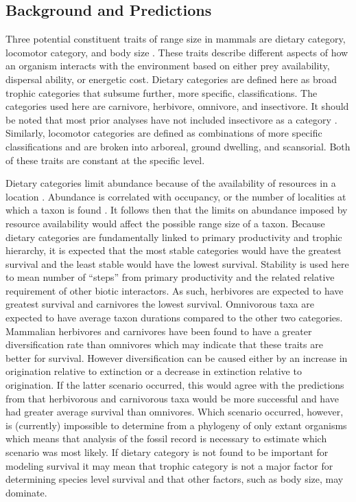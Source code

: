 \documentclass[12pt,letterpaper]{article}
\begin{document}
\subsection{Background and Predictions} 
Three potential constituent traits of range size in mammals are dietary category, locomotor category, and body size \citep{Smith2004,Smith2008b,Damuth1981a,Damuth1979,Jernvall2004,Lyons2005,Lyons2010}. These traits describe different aspects of how an organism interacts with the environment based on either prey availability, dispersal ability, or energetic cost. Dietary categories are defined here as broad trophic categories that subsume further, more specific, classifications. The categories used here are carnivore, herbivore, omnivore, and insectivore. It should be noted that most prior analyses have not included insectivore as a category \citep{Jernvall2004,Price2012}. Similarly, locomotor categories are defined as combinations of more specific classifications and are broken into arboreal, ground dwelling, and scansorial. Both of these traits are constant at the specific level. 

Dietary categories limit abundance because of the availability of resources in a location \citep{VanValen1989,Brown1987,Damuth1979,Silva1997,Janis2000}. Abundance is correlated with occupancy, or the number of localities at which a taxon is found \citep{Jernvall2002,Fortelius2002,Brown1984}. It follows then that the limits on abundance imposed by resource availability would affect the possible range size of a taxon. Because dietary categories are fundamentally linked to primary productivity and trophic hierarchy, it is expected that the most stable categories would have the greatest survival and the least stable would have the lowest survival. Stability is used here to mean number of ``steps'' from primary productivity and the related relative requirement of other biotic interactors. As such, herbivores are expected to have greatest survival and carnivores the lowest survival. Omnivorous taxa are expected to have average taxon durations compared to the other two categories. Mammalian herbivores and carnivores have been found to have a greater diversification rate than omnivores \citep{Price2012} which may indicate that these traits are better for survival. However diversification can be caused either by an increase in origination relative to extinction or a decrease in extinction relative to origination. If the latter scenario occurred, this would agree with the predictions from \citet{Price2012} that herbivorous and carnivorous taxa would be more successful and have had greater average survival than omnivores. Which scenario occurred, however, is (currently) impossible to determine from a phylogeny of only extant organisms \citep{Rabosky2010a} which means that analysis of the fossil record is necessary to estimate which scenario was most likely. If dietary category is not found to be important for modeling survival it may mean that trophic category is not a major factor for determining species level survival and that other factors, such as body size, may dominate. 
\end{document}
